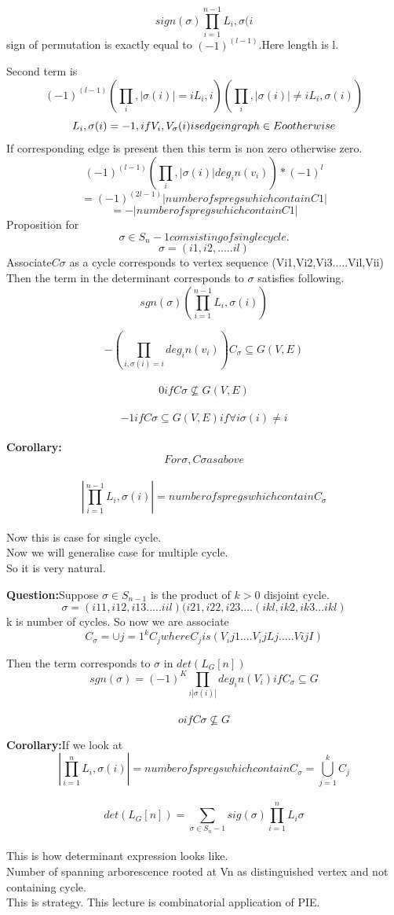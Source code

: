 $$sign(\sigma)\prod_{i=1}^{n-1} L_i,\sigma(i   $$
sign of permutation is exactly equal to
$(-1)^{(l-1)} $.Here length is l.

Second term is
$$ (-1)^{(l-1)} (\prod_i,|\sigma(i)|=i L_i,i)(\prod_i,|\sigma(i)| \neq i L_i,\sigma(i)) $$
$$ L_i,\sigma(i) =-1,if V_i,V_\sigma(i) is edge in graph \in E\\ ootherwise  $$
If corresponding edge is present then this term is non zero otherwise zero.\\
$$ (-1)^{(l-1)}(\prod_i,|\sigma(i)| deg_in(v_i))*(-1)^{l} $$
$$= (-1)^{(2l-1)} |number of spregs which contain C1|  $$
$$= -|number of spregs which contain C1 | $$
Proposition for $$ \sigma \in S_n-1 comsisting of single cycle.   $$$$ \sigma =(i1,i2,.....il)   $$
Associate$ C\sigma $ as a cycle corresponds to vertex sequence (Vi1,Vi2,Vi3.....Vil,Vii)\\
Then the term in the determinant corresponds to $\sigma$ satisfies following.\\
$$sgn(\sigma)(\prod_{i=1}^{n-1}L_i,\sigma(i))$$

$$-(\prod_{i,\sigma(i)=i}deg_in(v_i))C_\sigma \subseteq G(V,E) $$\\
$$ 0 if C\sigma \nsubseteq G(V,E) $$ \\
$$-1  if C\sigma \subseteq G(V,E) if \forall i \sigma(i) \neq i     $$\\


\textbf{Corollary:}$$For \sigma,C\sigma as above $$\\
$$ |\prod_{i=1}^{n-1}L_i,\sigma(i)|=number of spregs which contain C_\sigma   $$\\
Now this is case for single cycle.\\Now we will generalise case for multiple cycle.\\
So it is very natural.

\textbf{Question:}Suppose $\sigma \in S_{n-1}$ is the product of $k>0$ disjoint cycle.
$$\sigma=(i11,i12,i13.....iil) (i21,i22,i23....(ikl,ik2,ik3...ikl)   $$
k is number of cycles. So now we are associate
$$ C_\sigma = \cup  {j=1}^{k}C_j  where C_j is (V_ij1....V_ijLj.....VijI)$$

Then the term  corresponds to $\sigma$ in $det(L_G[n])$
$$sgn(\sigma) = (-1)^{K} \prod_{i|\sigma(i)|}deg_in(V_i) if C_\sigma \subseteq G   $$\\
$$ o if C\sigma \nsubseteq G $$

\textbf{Corollary:}If we look at\\
$$|\prod_{i=1}^{n}L_i,\sigma(i)|=number of spregs which contain C_\sigma = \bigcup_{j=1}^{k}C_j   $$\\
$$ det(L_G[n]) =\sum_{\sigma \in S_n-1}sig(\sigma) \prod_{i=1}^{n} L_i\sigma      $$\\
This is how determinant expression looks like.\\
Number of spanning arborescence rooted at Vn  as distinguished vertex and not containing cycle.\\
This is strategy.
This lecture is combinatorial application of PIE.


